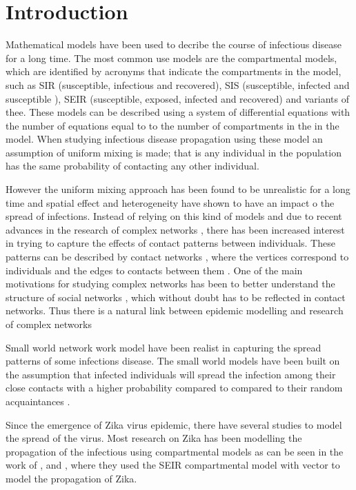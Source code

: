 \chapter{Introduction}
 Mathematical models have been used to decribe the course of infectious disease for a long time. The most common use models are the compartmental models, which are identified by acronyms that indicate the compartments in the model, such as SIR (susceptible, infectious and recovered), SIS (susceptible, infected and susceptible ), SEIR  (susceptible, exposed, infected and recovered) and variants of thee. These models can be described using a system of differential equations with the number of equations equal to to the number of compartments in the in the model. When studying infectious disease propagation using these model an assumption of uniform mixing is made; that is any individual in the population has the same probability of contacting any other individual.
 
 However the uniform mixing approach has been found to be unrealistic for a long time and spatial effect and heterogeneity have shown to have an impact o the spread of infections.  Instead of relying on this kind of models and due to recent advances in the research of complex networks , there has been increased interest in trying to capture the effects of contact patterns between individuals. These patterns can be described by contact networks , where the vertices correspond to individuals and the edges to contacts between them  \citep{wallinga1999perspective}. One of the main motivations for studying complex networks has been to better understand the structure of social networks , which without doubt has to be reflected in contact networks. Thus there is a natural link between epidemic modelling and research of complex networks \citep{kaski2005modeling}
 
 Small world network work model have been realist in capturing the spread patterns of some infections disease. The small world models have been built on the assumption that infected individuals will spread the infection among their close contacts with a higher probability compared to compared to their random acquaintances \citep{newman2002random}.
 
Since the emergence of Zika virus epidemic, there have several studies to model the spread of the virus. Most research on Zika has been modelling the propagation of the infectious using compartmental models as can be seen in the work of \cite{1}, \cite{2} and \cite{3}, where they used the SEIR compartmental model with vector to model the propagation of Zika. 

